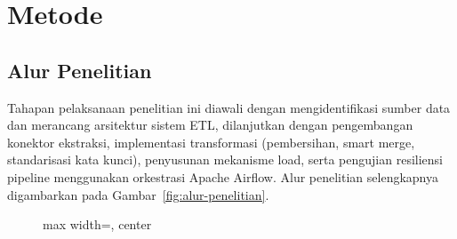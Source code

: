 \documentclass{rapidsart}
\theoremstyle{plain}
\theoremstyle{remark}
\theoremstyle{definition}
\begin{document}
\section{Metode}
\begin{sloppypar}

    \subsection{Alur Penelitian}
    Tahapan pelaksanaan penelitian ini diawali dengan mengidentifikasi sumber data dan merancang arsitektur sistem ETL, dilanjutkan dengan pengembangan konektor ekstraksi, implementasi transformasi (pembersihan, smart merge, standarisasi kata kunci), penyusunan mekanisme load, serta pengujian resiliensi pipeline menggunakan orkestrasi Apache Airflow. Alur penelitian selengkapnya digambarkan pada Gambar~\ref{fig:alur-penelitian}.

    \begin{figure}[htbp]
        \centering
        \begin{adjustbox}{max width=\textwidth, center}
\end{adjustbox}
\end{figure}
\end{sloppypar}
\end{document}

